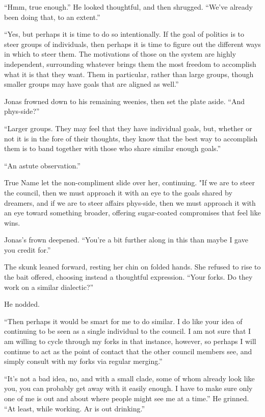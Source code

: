 ``Hmm, true enough.'' He looked thoughtful, and then shrugged. ``We've already been doing that, to an extent.''

``Yes, but perhaps it is time to do so intentionally. If the goal of politics is to steer groups of individuals, then perhaps it is time to figure out the different ways in which to steer them. The motivations of those on the system are highly independent, surrounding whatever brings them the most freedom to accomplish what it is that they want. Them in particular, rather than large groups, though smaller groups may have goals that are aligned as well.''

Jonas frowned down to his remaining weenies, then set the plate aside. ``And phys-side?''

``Larger groups. They may feel that they have individual goals, but, whether or not it is in the fore of their thoughts, they know that the best way to accomplish them is to band together with those who share similar enough goals.''

``An astute observation.''

True Name let the non-compliment slide over her, continuing. "If we are to steer the council, then we must approach it with an eye to the goals shared by dreamers, and if we are to steer affairs phys-side, then we must approach it with an eye toward something broader, offering sugar-coated compromises that feel like wins.

Jonas's frown deepened. ``You're a bit further along in this than maybe I gave you credit for.''

The skunk leaned forward, resting her chin on folded hands. She refused to rise to the bait offered, choosing instead a thoughtful expression. ``Your forks. Do they work on a similar dialectic?''

He nodded.

``Then perhaps it would be smart for me to do similar. I do like your idea of continuing to be seen as a single individual to the council. I am not sure that I am willing to cycle through my forks in that instance, however, so perhaps I will continue to act as the point of contact that the other council members see, and simply consult with my forks via regular merging.''

``It's not a bad idea, no, and with a small clade, some of whom already look like you, you can probably get away with it easily enough. I have to make sure only one of me is out and about where people might see me at a time.'' He grinned. ``At least, while working. Ar is out drinking.''

